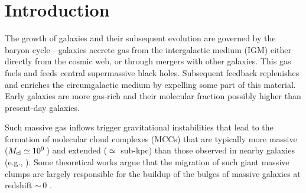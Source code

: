 \IfFileExists{emulateapjlegacy.cls}{\documentclass[iop]{emulateapjlegacy}}{\documentclass[iop]{emulateapj}}
\begin{document}

\section{Introduction}
The growth of galaxies and their subsequent evolution are governed by the baryon cycle---galaxies accrete gas from the intergalactic medium (IGM) 
     either directly from the cosmic web, or through mergers with other galaxies.  This gas fuels \SF and feeds central
supermassive black holes. Subsequent feedback replenishes and enriches the circumgalactic medium 
   by expelling some
part of this material. 
    Early
galaxies 
are more gas-rich and their molecular fraction possibly higher 
   than
present-day galaxies.

Such massive gas inflows trigger gravitational instabilities that lead to the formation of molecular 
   cloud complexes (MCCs) 
that are typically more massive ($M_{\rm cl}\simeq 10^9$\,\Msun) and extended ($\simeq$ sub-kpc) than those observed in nearby galaxies (e.g., \citealt{Gabor13a, Hopkins14a, Inoue16a}).
%
Some theoretical works argue that the migration of such giant massive clumps are largely responsible for the buildup of the bulges of massive galaxies at redshift \z$\sim$\,0 \citep[e.g.,][]{Ceverino10a}.
\end{document}
